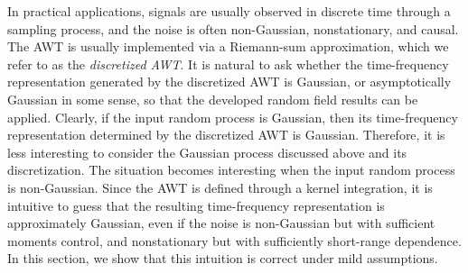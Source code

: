 \documentclass{amsart}
\begin{document}
In practical applications, signals are usually observed in discrete time through a sampling process, and the noise is often non-Gaussian, nonstationary, and causal. The AWT is usually implemented via a Riemann-sum approximation,
which we refer to as the {\em discretized AWT}.
It is natural to ask whether the time-frequency representation generated by the discretized AWT is Gaussian, or asymptotically Gaussian in some sense, so that the developed random field results can be applied.
%
Clearly, if the input random process is Gaussian, then its time-frequency representation determined by
the discretized AWT is Gaussian. Therefore, it is less interesting to consider the Gaussian process discussed above and its discretization. The situation becomes interesting when the input random process is non-Gaussian. Since the AWT is defined through a kernel integration, it is intuitive to guess that the resulting time-frequency representation is approximately Gaussian, even if the noise is non-Gaussian but with sufficient moments control, and nonstationary but with sufficiently short-range dependence.
In this section, we show that this intuition is correct under mild assumptions.
\end{document}
